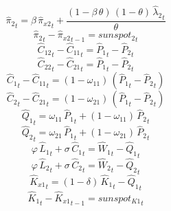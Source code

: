 \begin{dmath}
{{\hat{\pi}_{2}}}_{t}={{\beta}}\, {{\hat{\pi}_{x2}}}_{t}+\frac{\left(1-{{\beta}}\, {{\theta}}\right)\, \left(1-{{\theta}}\right)\, {{\hat{\lambda}_{2}}}_{t}}{{{\theta}}}
\end{dmath}
\begin{dmath}
{{\hat{\pi}_{2}}}_{t}-{{\hat{\pi}_{x2}}}_{t-1}={{sunspot_{2}}}_{t}
\end{dmath}
\begin{dmath}
{{\hat{C}_{12}}}_{t}-{{\hat{C}_{11}}}_{t}={{\hat{P}_{1}}}_{t}-{{\hat{P}_{2}}}_{t}
\end{dmath}
\begin{dmath}
{{\hat{C}_{22}}}_{t}-{{\hat{C}_{21}}}_{t}={{\hat{P}_{1}}}_{t}-{{\hat{P}_{2}}}_{t}
\end{dmath}
\begin{dmath}
{{\hat{C}_{1}}}_{t}-{{\hat{C}_{11}}}_{t}=\left(1-{{\omega_{11}}}\right)\, \left({{\hat{P}_{1}}}_{t}-{{\hat{P}_{2}}}_{t}\right)
\end{dmath}
\begin{dmath}
{{\hat{C}_{2}}}_{t}-{{\hat{C}_{21}}}_{t}=\left(1-{{\omega_{21}}}\right)\, \left({{\hat{P}_{1}}}_{t}-{{\hat{P}_{2}}}_{t}\right)
\end{dmath}
\begin{dmath}
{{\hat{Q}_{1}}}_{t}={{\omega_{11}}}\, {{\hat{P}_{1}}}_{t}+\left(1-{{\omega_{11}}}\right)\, {{\hat{P}_{2}}}_{t}
\end{dmath}
\begin{dmath}
{{\hat{Q}_{2}}}_{t}={{\omega_{21}}}\, {{\hat{P}_{1}}}_{t}+\left(1-{{\omega_{21}}}\right)\, {{\hat{P}_{2}}}_{t}
\end{dmath}
\begin{dmath}
{{\varphi}}\, {{\hat{L}_{1}}}_{t}+{{\sigma}}\, {{\hat{C}_{1}}}_{t}={{\hat{W}_{1}}}_{t}-{{\hat{Q}_{1}}}_{t}
\end{dmath}
\begin{dmath}
{{\varphi}}\, {{\hat{L}_{2}}}_{t}+{{\sigma}}\, {{\hat{C}_{2}}}_{t}={{\hat{W}_{2}}}_{t}-{{\hat{Q}_{2}}}_{t}
\end{dmath}
\begin{dmath}
{{\hat{K}_{x1}}}_{t}=\left(1-{{\delta}}\right)\, {{\hat{K}_{1}}}_{t}-{{\hat{Q}_{1}}}_{t}
\end{dmath}
\begin{dmath}
{{\hat{K}_{1}}}_{t}-{{\hat{K}_{x1}}}_{t-1}={{sunspot_{K1}}}_{t}
\end{dmath}
